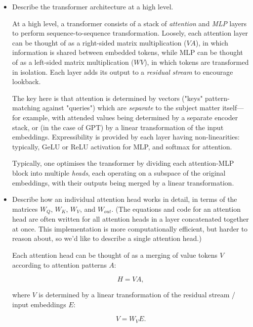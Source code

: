\documentclass[11pt]{article}
\newenvironment{answerbox}%
  {\begin{mdframed}[linecolor=darkgray,%
                    roundcorner=10pt,innertopmargin=10pt,%
                    innerbottommargin=10pt,skipabove=12pt,skipbelow=12pt]}%
  {\end{mdframed}}
\begin{document}
\begin{itemize}
    \item Describe the transformer architecture at a high level.

    \begin{answerbox}
            At a high level, a transformer consists of a stack of \textit{attention} and \textit{MLP} layers to perform sequence-to-sequence transformation. Loosely, each attention layer can be thought of as a right-sided matrix multiplication ($VA$), in which information is shared between embedded tokens, while MLP can be thought of as a left-sided matrix multiplication ($WV$), in which tokens are transformed in isolation. Each layer adds its output to a \textit{residual stream} to encourage lookback.
            
            The key here is that attention is determined by vectors ("keys" pattern-matching against "queries") which are \textit{separate} to the subject matter itself---for example, with attended values being determined by a separate encoder stack, or (in the case of GPT) by a linear transformation of the input embeddings. Expressibility is provided by each layer having non-linearities: typically, GeLU or ReLU activation for MLP, and softmax for attention.

            Typically, one optimises the transformer by dividing each attention-MLP block into multiple \textit{heads}, each operating on a subspace of the original embeddings, with their outputs being merged by a linear transformation.
    \end{answerbox}
        
    \item Describe how an individual attention head works in detail, in terms of the matrices $W_Q$, $W_K$, $W_V$, and $W_{out}$. (The equations and code for an attention head are often written for all attention heads in a layer concatenated together at once. This implementation is more computationally efficient, but harder to reason about, so we'd like to describe a single attention head.)

    \begin{answerbox}
        Each attention head can be thought of as a merging of value tokens $V$ according to attention patterns $A$:

        $$H = VA,$$

        where $V$ is determined by a linear transformation of the residual stream / input embeddings $E$:

        $$V = W_{V}E.$$


\end{answerbox}
\end{itemize}
\end{document}
